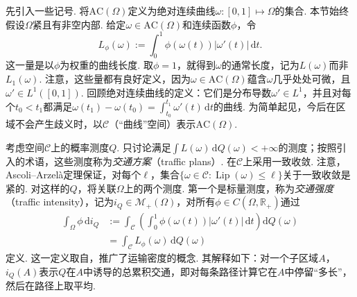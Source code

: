 \label{idx:root4-p134-ac-curves}先引入一些记号. 将$\mathrm{AC}(\Omega)$定义为绝对连续曲线$\omega:[0,1]\mapsto\Omega$的集合. 本节始终假设$\Omega$紧且有非空内部. 给定$\omega\in\mathrm{AC}(\Omega)$和连续函数$\phi$，令
\begin{equation}\label{eq:4.8}
 L_\phi(\omega):=\int_0^1\phi(\omega(t))|\omega'(t)|\,\mathrm dt.
\end{equation}
这一量是以$\phi$为权重的曲线长度. 取$\phi=1$，就得到$\omega$的通常长度，记为$L(\omega)$而非$L_1(\omega)$. 注意，这些量都有良好定义，因为$\omega\in\mathrm{AC}(\Omega)$蕴含$\omega$几乎处处可微，且$\omega'\in L^1([0,1])$. 回顾绝对连续曲线的定义：它们是分布导数$\omega'\in L^1$，并且对每个$t_0<t_1$都满足$\omega(t_1)-\omega(t_0)=\int_{t_0}^{t_1}\omega'(t)\,\mathrm dt$的曲线. 为简单起见，今后在区域不会产生歧义时，以$\mathscr C$（“曲线”空间）表示$\mathrm{AC}(\Omega)$.

考虑空间$\mathscr C$上的概率测度$Q$. 只讨论满足$\int L(\omega)\,\mathrm dQ(\omega)<+\infty$的测度；按照\cite{b48}引入的术语，这些测度称为\emph{交通方案}（traffic plans）. 在$\mathscr C$上采用一致收敛. 注意，Ascoli--Arzel\`a定理保证，对每个$\ell$，集合$\{\omega\in\mathscr C:\operatorname{Lip}(\omega)\leq\ell\}$关于一致收敛是紧的. 对这样的$Q$，将关联$\Omega$上的两个测度. 第一个是标量测度，称为\emph{交通强度}（traffic intensity），记为$i_Q\in\mathscr M_+(\Omega)$，对所有$\phi\in C(\Omega,\mathbb R_+)$通过
\begin{equation*}
\begin{aligned}
 \int_\Omega\phi\,\mathrm di_Q
 &:=\int_{\mathscr C}\left(\int_0^1\phi(\omega(t))|\omega'(t)|\,\mathrm dt\right)\mathrm dQ(\omega)\\
 &=\int_{\mathscr C}L_\phi(\omega)\,\mathrm dQ(\omega)
\end{aligned}
\end{equation*}
定义. 这一定义取自\cite{b112}，推广了运输密度的概念. 其解释如下：对一个子区域$A$，$i_Q(A)$表示$Q$在$A$中诱导的总累积交通，即对每条路径计算它在$A$中停留“多长”，然后在路径上取平均.

